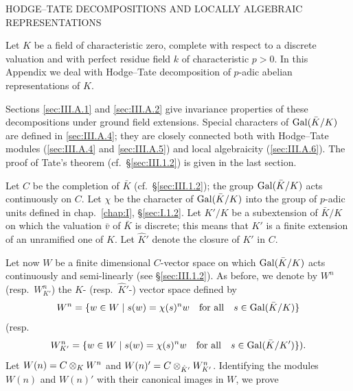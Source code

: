 
%
  {HODGE--TATE DECOMPOSITIONS AND LOCALLY ALGEBRAIC REPRESENTATIONS}

Let $K$ be a field of characteristic zero, complete with respect to a
discrete valuation and with perfect residue field $k$ of characteristic
$p>0$.  In this Appendix we deal with Hodge--Tate decomposition of
$p$-adic abelian representations of $K$.

Sections \ref{sec:III.A.1} and \ref{sec:III.A.2} give invariance
properties of these decompositions under ground field extensions.
Special characters of $\mathrm{Gal}(\bar K/K)$ are defined in \ref{sec:III.A.4};
they are closely connected both with Hodge--Tate modules
(\ref{sec:III.A.4} and \ref{sec:III.A.5}) and local algebraicity
(\ref{sec:III.A.6}).  The proof of Tate's theorem
(cf.~\S\ref{sec:III.1.2}) is given in the last section.


Let $C$ be the completion of $\bar K$ (cf.~\S\ref{sec:III.1.2}); the
group $\mathrm{Gal}(\bar K/K)$ acts continuously on $C$.  Let $\chi$ be the
character of $\mathrm{Gal}(\bar K/K)$ into the group of $p$-adic units defined
in chap.~\ref{chap:I}, \S\ref{sec:I.1.2}.  Let $K'/K$ be a subextension
of $\bar K/K$ on which the valuation $\bar v$ of $\bar K$ is discrete;
this means that $K'$ is a finite extension of an unramified one of $K$.
Let $\hat K'$ denote the closure of $K'$ in $C$.

Let now $W$ be a finite dimensional $C$-vector space on which
$\mathrm{Gal}(\bar K/K)$ acts continuously and semi-linearly (see
\S\ref{sec:III.1.2}).  As before, we denote by $W^n$ (resp.\
$W^n_{K'}$) the $K$- (resp.\ $\hat K'$-) vector space defined by
\[
W^n=\{w\in W \mid s(w)=\chi(s)^n w \quad\text{for all}\quad
s\in\mathrm{Gal}(\bar K/K)\}
\]
(resp.
\[
W^n_{K'}=\{w\in W \mid s(w)=\chi(s)^n w \quad\text{for all}\quad
s\in\mathrm{Gal}(\bar K/K')\}).
\]
Let $W(n)=C\mathbin{\otimes}_K W^n$ and $W(n)'=C\mathbin{\otimes}_{\hat K'} W^n_{K'}$.
Identifying the modules $W(n)$ and $W(n)'$ with their canonical images
in $W$, we prove

